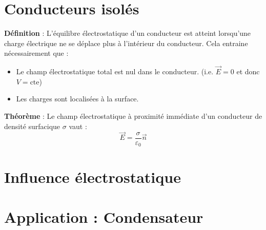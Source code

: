 \section{Conducteurs isolés}

\noindent\textbf{Définition} : L'équilibre électrostatique d'un conducteur est atteint lorsqu'une charge électrique ne se déplace plus à l'intérieur du conducteur. Cela entraine nécessairement que :
\begin{itemize}
\item Le champ électrostatique total est nul dans le conducteur. (i.e. $\vec{E}=0$ et donc $V=\textrm{cte}$)
\item Les charges sont localisées à la surface.\\
\end{itemize}
\noindent\textbf{Théorème} : Le champ électrostatique à proximité immédiate d'un conducteur de densité surfacique $\sigma$ vaut :
\[ \vec{E}=\frac{\sigma}{\varepsilon_0}\vec{n} \]

\section{Influence électrostatique}

\section{Application : Condensateur}
